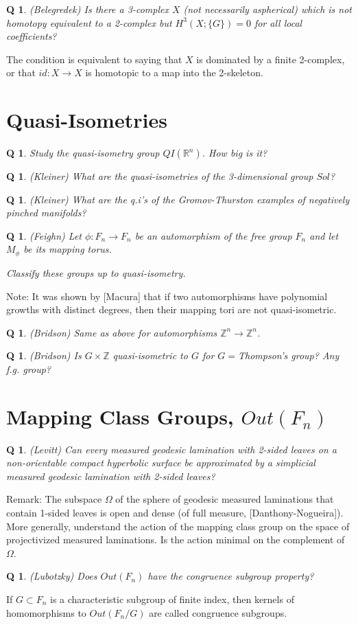 \documentclass[11pt]{article}
\newtheorem{q}[thm]{Q}
\theoremstyle{remark}
\def\b{\begin{q}}
\def\e{\end{q}}
\def\R{{\mathbb R}}
\def\Z{{\mathbb Z}}
\newcommand{\<}{\langle}
\renewcommand{\>}{\rangle}
\begin{document}
\b
(Belegredek)
Is there a 3-complex $X$ (not necessarily aspherical) which is
not homotopy equivalent to a 2-complex but $H^3(X;\{G\})=0$ for all
local coefficients? \e

The condition is equivalent to saying that $X$ is dominated by a
finite 2-complex, or that $id:X\to X$ is homotopic to a map into the
2-skeleton. 

\section{Quasi-Isometries}

\b
Study the quasi-isometry group $QI(\R^n)$. How big is it?\e

\b
(Kleiner) What are the quasi-isometries of the 3-dimensional
group $Sol$?\e

\b
(Kleiner) What are the q.i's of the Gromov-Thurston examples
of negatively pinched manifolds?\e

\b
(Feighn) {\rm Let $\phi:F_n\to F_n$ be an automorphism of the free
group $F_n$ and let $M_\phi$ be its mapping torus. }

Classify these groups up to quasi-isometry.\e

Note: It was shown by [Macura] that if two automorphisms have polynomial
growths with distinct degrees, then their mapping tori are not
quasi-isometric. 

\b
(Bridson) Same as above for automorphisms $\Z^n\to \Z^n$.\e

\b
(Bridson) Is $G\times \Z$ 
quasi-isometric to $G$ for $G=$Thompson's group? Any
f.g. group?\e






\section{Mapping Class Groups, $Out(F_n)$}

\b
(Levitt) Can every measured geodesic lamination with 2-sided
leaves on a non-orientable compact hyperbolic surface be approximated
by a simplicial measured geodesic lamination with 2-sided leaves?\e
Remark: The subspace $\Omega$ of the sphere of geodesic measured
laminations that contain 1-sided leaves is open and dense (of full
measure, [Danthony-Nogueira]). More generally, understand the action
of the mapping class group on the space of projectivized measured
laminations. Is the action minimal on the complement of $\Omega$.  

\b
(Lubotzky) Does $Out(F_n)$ have the congruence subgroup property?\e
If $G\subset F_n$ is a characteristic subgroup of finite index, then kernels
of homomorphisms to $Out(F_n/G)$ are called congruence subgroups.
\end{document}
